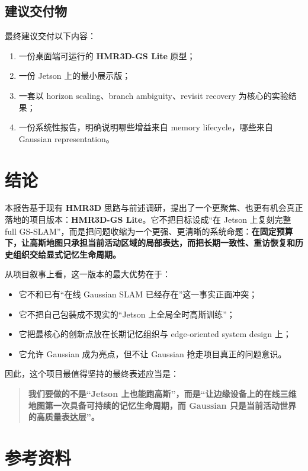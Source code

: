 \documentclass[12pt]{article}
\newcommand{\system}{\textbf{HMR3D-GS Lite}}
\newcommand{\hmr}{\textbf{HMR3D}}
\begin{document}
\subsection{建议交付物}

最终建议交付以下内容：
\begin{enumerate}
  \item 一份桌面端可运行的 \system{} 原型；
  \item 一份 Jetson 上的最小展示版；
  \item 一套以 horizon scaling、branch ambiguity、revisit recovery 为核心的实验结果；
  \item 一份系统性报告，明确说明哪些增益来自 memory lifecycle，哪些来自 Gaussian representation。
\end{enumerate}

\section{结论}

本报告基于现有 \hmr{} 思路与前述调研，提出了一个更聚焦、也更有机会真正落地的项目版本：\system{}。它不把目标设成“在 Jetson 上复刻完整 full GS-SLAM”，而是把问题收缩为一个更强、更清晰的系统命题：\textbf{在固定预算下，让高斯地图只承担当前活动区域的局部表达，而把长期一致性、重访恢复和历史组织交给显式记忆生命周期。}

从项目叙事上看，这一版本的最大优势在于：
\begin{itemize}
  \item 它不和已有“在线 Gaussian SLAM 已经存在”这一事实正面冲突；
  \item 它不把自己包装成不现实的“Jetson 上全局全时高斯训练”；
  \item 它把最核心的创新点放在长期记忆组织与 edge-oriented system design 上；
  \item 它允许 Gaussian 成为亮点，但不让 Gaussian 抢走项目真正的问题意识。
\end{itemize}

因此，这个项目最值得坚持的最终表述应当是：
\begin{quote}
\textbf{我们要做的不是“Jetson 上也能跑高斯”，而是“让边缘设备上的在线三维地图第一次具备可持续的记忆生命周期，而 Gaussian 只是当前活动世界的高质量表达层”。}
\end{quote}

\section*{参考资料}
\end{document}
